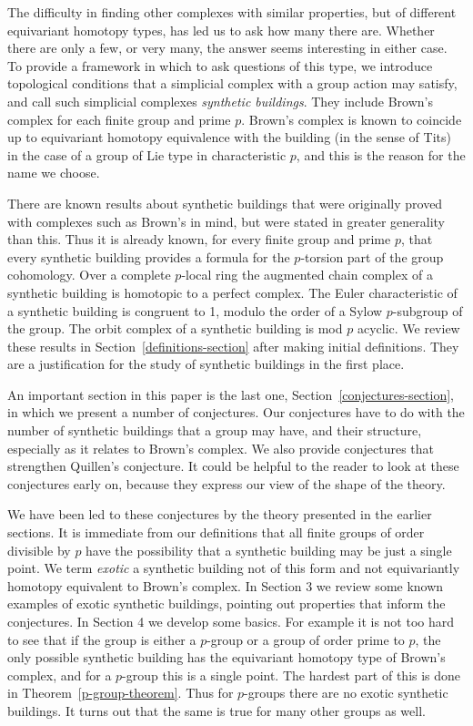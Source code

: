 \documentclass[12pt]{amsart}
\theoremstyle{plain}
\theoremstyle{definition}
\theoremstyle{remark}
\numberwithin{equation}{section}
\begin{document}
The difficulty in finding other complexes with similar properties, but of different equivariant homotopy types, has led us to ask how many there are. Whether there are only a few, or very many, the answer seems interesting in either case. To provide a framework in which to ask questions of this type, we introduce topological conditions that a simplicial complex with a group action may satisfy, and call such simplicial complexes \textit{synthetic buildings}. They include Brown's complex for each finite group and prime $p$.  Brown's complex is known to coincide up to equivariant homotopy equivalence with the building (in the sense of Tits) in the case of a group of Lie type in characteristic $p$, and this is the reason for the name we choose.

There are known results about synthetic buildings that were originally proved with complexes such as Brown's in mind, but  were stated in greater generality than this. Thus it is already known, for every finite group and prime $p$, that every synthetic building provides a  formula for the $p$-torsion part of the group cohomology. Over a complete $p$-local ring the augmented chain complex of a synthetic building is homotopic to a perfect complex. The Euler characteristic of a synthetic building is congruent to 1, modulo the order of a Sylow $p$-subgroup of the group. The orbit complex of a synthetic building is mod $p$ acyclic. We review these results in Section~\ref{definitions-section}  after making initial definitions. They are a justification for the study of synthetic buildings in the first place.

An important section in this paper is the last one, Section~\ref{conjectures-section}, in which we present a number of conjectures. Our conjectures have to do with the number of synthetic buildings that a group may have, and their structure, especially as it relates to Brown's complex. We also provide conjectures that strengthen Quillen's conjecture. It could be helpful to the reader to look at these conjectures early on, because they express our view of the shape of the theory.

We have been led to these conjectures by the theory presented in the earlier sections. It is immediate from our definitions that all finite groups of order divisible by $p$ have the possibility that a synthetic building may be just a single point. We term \textit{exotic} a synthetic building not of this form and not equivariantly homotopy equivalent to Brown's complex. In Section 3 we review some known examples of exotic synthetic buildings, pointing out properties that inform the conjectures. In Section 4 we develop some basics. For example it is not too hard to see that if the group is either a $p$-group or a group of order prime to $p$, the only possible synthetic building has the equivariant homotopy type of Brown's complex, and for a $p$-group this is a single point. The hardest part of this is done in Theorem~\ref{p-group-theorem}. Thus for $p$-groups there are no exotic synthetic buildings. It turns out that the same is true for many other groups as well.
\end{document}
